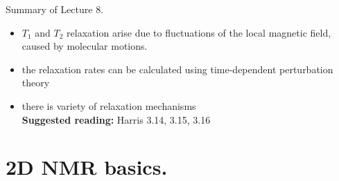 \documentclass[handout]{beamer}
\begin{document}
\begin{frame}{Summary of Lecture 8.}
    \begin{itemize}
    	\item $T_1$ and $T_2$ relaxation arise due to fluctuations of the local magnetic field, caused by molecular motions.
    	\item the relaxation rates can be calculated using time-dependent perturbation theory
    	\item there is variety of relaxation mechanisms \\
        \textbf{Suggested reading:} Harris 3.14, 3.15, 3.16
    \end{itemize}
\end{frame}

\section{2D NMR basics.}
\end{document}
